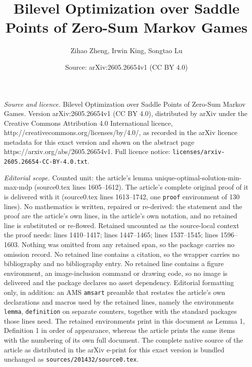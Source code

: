 \documentclass[10pt,a4paper]{amsart}
\title{Bilevel Optimization over Saddle Points of Zero-Sum Markov Games}
\author{Zihao Zheng, Irwin King, Songtao Lu}
\date{Source: arXiv:2605.26654v1 (CC BY 4.0)}
\begin{document}
\maketitle

\noindent\emph{Source and licence.} Bilevel Optimization over Saddle Points of Zero-Sum Markov Games. Version arXiv:2605.26654v1 (CC BY 4.0), distributed by arXiv under the Creative Commons Attribution 4.0 International licence, http://creativecommons.org/licenses/by/4.0/, as recorded in the arXiv licence metadata for this exact version and shown on the abstract page https://arxiv.org/abs/2605.26654v1. Full licence notice: \texttt{licenses/arxiv-2605.26654-CC-BY-4.0.txt}.\par\smallskip

\noindent\textit{Editorial scope.} Counted unit: the article's lemma unique-optimal-solution-min-max-mdp (source0.tex lines 1605--1612). The article's complete original proof of it is delivered with it (source0.tex lines 1613--1742, one \texttt{proof} environment of 130 lines). No mathematics is written, repaired or re-derived: the statement and the proof are the article's own lines, in the article's own notation, and no retained line is substituted or re-flowed.  Retained uncounted as the source-local context the proof needs: lines 1410--1417; lines 1447--1465; lines 1537--1545; lines 1596--1603.  Nothing was omitted from any retained span, so the package carries no omission record.  No retained line contains a citation, so the wrapper carries no bibliography and no bibliography entry.  No retained line contains a figure environment, an image-inclusion command or drawing code, so no image is delivered and the package declares no asset dependency.  Editorial formatting only, in addition: an AMS \texttt{amsart} preamble that restates the article's own declarations and macros used by the retained lines, namely the environments \texttt{lemma}, \texttt{definition} on separate counters, together with the standard packages those lines need.  The retained environments print in this document as Lemma 1, Definition 1 in order of appearance, whereas the article prints the same items with the numbering of its own full document.  The complete native source of the article as distributed in the arXiv e-print for this exact version is bundled unchanged as \texttt{sources/201432/source0.tex}.
\end{document}
